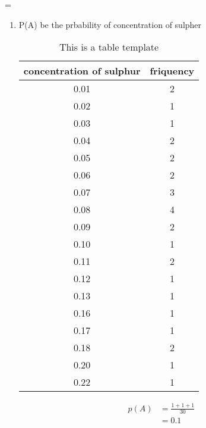 =\renewcommand{\theequation}{\theenumi}
\begin{enumerate}[label=\arabic*.,ref=\thesubsection.\theenumi]
\item P(A) be the prbability of concentration of sulpher

\begin{table}[!ht]
\begin{tabular}{ |c|c| } 
	\hline
	\textbf{concentration of sulphur} &\textbf{friquency}\\
	\hline
	0.01 &2\\ 
	0.02 &1\\ 
	0.03 &1\\ 
	0.04 &2\\ 
	0.05 &2\\ 
	0.06 &2\\ 
	0.07 &3\\
	0.08 &4\\ 
	0.09 &2\\ 
	0.10 &1\\ 
	0.11 &2\\ 
	0.12 &1\\ 
	0.13 &1\\ 
	0.16 &1\\ 
	0.17 &1\\ 
	0.18 &2\\ 
	0.20 &1\\ 
	0.22 &1\\   
	\hline
\end{tabular}	
	\caption{This is a table template}
	\label{tab:template}
\end{table}
\begin{align}
p\left(A\right) &= \frac{1+1+1}{30}
\\
&= 0.1
\end{align}
\end{enumerate}